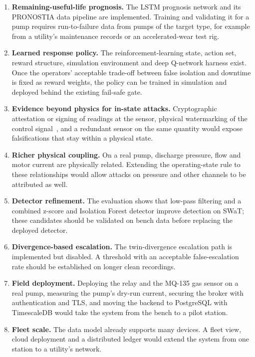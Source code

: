 \begin{enumerate}
  \item \textbf{Remaining-useful-life prognosis.} The LSTM prognosis network and its PRONOSTIA data pipeline are implemented. Training and validating it for a pump requires run-to-failure data from pumps of the target type, for example from a utility's maintenance records or an accelerated-wear test rig.
  \item \textbf{Learned response policy.} The reinforcement-learning state, action set, reward structure, simulation environment and deep Q-network harness exist. Once the operators' acceptable trade-off between false isolation and downtime is fixed as reward weights, the policy can be trained in simulation and deployed behind the existing fail-safe gate.
  \item \textbf{Evidence beyond physics for in-state attacks.} Cryptographic attestation or signing of readings at the sensor, physical watermarking of the control signal~\cite{mo2009replay}, and a redundant sensor on the same quantity would expose falsifications that stay within a physical state.
  \item \textbf{Richer physical coupling.} On a real pump, discharge pressure, flow and motor current are physically related. Extending the operating-state rule to these relationships would allow attacks on pressure and other channels to be attributed as well.
  \item \textbf{Detector refinement.} The evaluation shows that low-pass filtering and a combined z-score and Isolation Forest detector improve detection on SWaT; these candidates should be validated on bench data before replacing the deployed detector.
  \item \textbf{Divergence-based escalation.} The twin-divergence escalation path is implemented but disabled. A threshold with an acceptable false-escalation rate should be established on longer clean recordings.
  \item \textbf{Field deployment.} Deploying the relay and the MQ-135 gas sensor on a real pump, measuring the pump's dry-run current, securing the broker with authentication and TLS, and moving the backend to PostgreSQL with TimescaleDB would take the system from the bench to a pilot station.
  \item \textbf{Fleet scale.} The data model already supports many devices. A fleet view, cloud deployment and a distributed ledger would extend the system from one station to a utility's network.
\end{enumerate}
